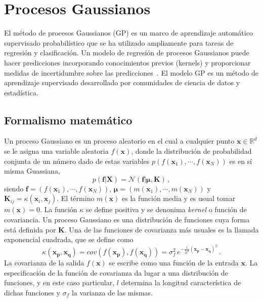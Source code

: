 \chapter{Procesos Gaussianos}
\label{app:gp}

El método de procesos Gaussianos (GP) es un marco de aprendizaje 
automático supervisado probabilístico que se ha utilizado ampliamente 
para tareas de regresión y clasificación. Un modelo de regresión de 
procesos Gaussianos puede hacer predicciones incorporando conocimientos 
previos (kernels) y proporcionar medidas de incertidumbre sobre las 
predicciones~\cite{Rasmussen:06}. El modelo GP es un método de 
aprendizaje supervisado desarrollado por comunidades de ciencia de datos
y estadística. 

\section*{Formalismo matemático}

Un proceso Gaussiano es un proceso aleatorio en el cual a cualquier 
punto $\mathbf{x}\in \mathbb{R}^d$ se le asigna una variable aleatoria 
$f(\mathbf{x})$, donde la distribución de probabilidad conjunta de un 
número dado de estas variables 
$p(f(\mathbf{x}_1),\cdots,f(\mathbf{x}_N))$ es en sí misma Guassiana,
\begin{equation}
p(\mathbf{f}|\mathbf{X})
=\mathcal{N}(\mathbf{f}|\boldsymbol{\mu},\mathbf{K})\,,
\end{equation}
siendo $\mathbf{f}=(f(\mathbf{x}_1),\cdots,f(\mathbf{x}_N))$, 
$\boldsymbol\mu=(m(\mathbf{x}_1),\cdots,m(\mathbf{x}_N))$ y 
$\mathbf{K}_{ij}=\kappa(\mathbf{x}_i,\mathbf{x}_j)$. El término 
$m(\mathbf{x})$ es la función media y es usual tomar $m(\mathbf{x})=0$.
La función $\kappa$ se define positiva y se denonima \textit{kernel}
o función de covariancia. Un proceso Gaussiano es una distribución de 
funciones cuya forma está definida por $\mathbf{K}$. Una de las 
funciones de covarianza más usuales es la llamada exponencial
cuadrada, que se define como
\begin{equation}
\kappa(\mathbf{x}_{\mathbf{p}},\mathbf{x}_{\mathbf{q}})
=cov(f(\mathbf{x}_{\mathbf{p}}),f(\mathbf{x}_{\mathbf{q}}))
=\sigma_f^2\,e^{-\frac{1}{2l^2}(\mathbf{x}_{\mathbf{p}}
-\mathbf{x}_{\mathbf{q}})^2}\,.
\end{equation}
La covarianza de la salida $f(\mathbf{x})$ se escribe como una función 
de la entrada $\mathbf{x}$. La especificación de la función de 
covarianza da lugar a una distribución de funciones, y en este caso 
particular, $l$ determina la longitud característica de dichas funciones
y $\sigma_f$ la varianza de las mismas. 


